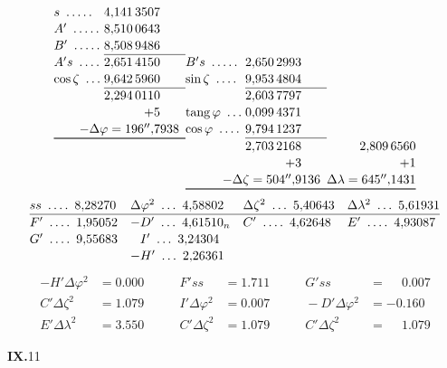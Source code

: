 {\small
\[
\renewcommand{\arraystretch}{1.1}
\begin{array}{@{}l@{\;}r@{\qquad}l@{\;}r@{\qquad}r@{}}
s\ \ixmathdots{5}&4{,}141\,3507&&&\\
A'\ \ixmathdots{5}&8{,}510\,0643&&&\\
B'\ \ixmathdots{5}&8{,}508\,9486&&&\\
\cline{2-2}
A's\ \ixmathdots{4}&2{,}651\,4150&B's\ \ixmathdots{5}&2{,}650\,2993&\\
\cos\zeta\ \ixmathdots{3}&9{,}642\,5960&\sin\zeta\ \ixmathdots{4}&9{,}953\,4804&\\
\cline{2-2}\cline{4-4}
&2{,}294\,0110&&2{,}603\,7797&\\
&+5&\operatorname{tang}\varphi\ \ixmathdots{3}&0{,}099\,4371&\\
\multicolumn{2}{r}{-\Delta\varphi=196''{,}7938}&
\cos\varphi\ \ixmathdots{4}&9{,}794\,1237&\\
\cline{1-2}\cline{4-4}\noalign{\vskip .45pt}\cline{1-2}
&&&2{,}703\,2168&2{,}809\,6560\\
&&&+3&+1\\
&&\multicolumn{2}{r}{-\Delta\zeta=504''{,}9136}&
\Delta\lambda=645''{,}1431\\
\cline{3-4}\cline{5-5}\noalign{\vskip .45pt}\cline{3-4}\cline{5-5}
\end{array}
\]
\[
\begin{array}{@{}l@{\quad}l@{\quad}l@{\quad}l@{}}
ss\ \ixmathdots{4}\ 8{,}28270&
\Delta\varphi^2\ \ixmathdots{3}\ 4{,}58802&
\Delta\zeta^2\ \ixmathdots{3}\ 5{,}40643&
\Delta\lambda^2\ \ixmathdots{3}\ 5{,}61931\\
\hline
F'\ \ixmathdots{4}\ 1{,}95052&
-D'\ \ixmathdots{3}\ 4{,}61510_n&
C'\ \ixmathdots{4}\ 4{,}62648&
E'\ \ixmathdots{4}\ 4{,}93087\\
G'\ \ixmathdots{4}\ 9{,}55683&
\phantom{-}I'\ \ixmathdots{3}\ 3{,}24304&&\\
&-H'\ \ixmathdots{3}\ 2{,}26361&&
\end{array}
\]
\[
\begin{alignedat}{3}
-H'\Delta\varphi^2&=0.000
&\qquad F'ss&=1.711
&\qquad G'ss&=\phantom{-}0.007\\
C'\Delta\zeta^2&=1.079
&\qquad I'\Delta\varphi^2&=0.007
&\qquad -D'\Delta\varphi^2&=-0.160\\
E'\Delta\lambda^2&=3.550
&\qquad C'\Delta\zeta^2&=1.079
&\qquad C'\Delta\zeta^2&=\phantom{-}1.079
\end{alignedat}
\]
\par
}
\noindent\textbf{IX.}\hfill 11\hspace{.12\textwidth}\par
\par
\endgroup
